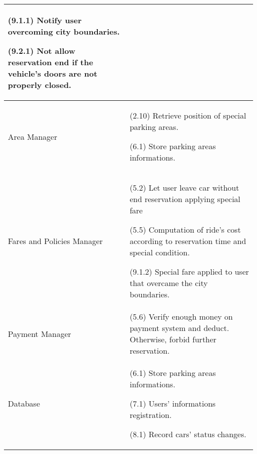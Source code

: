 \begin{longtable}{ |l|p{10cm}| }
(9.1.1) Notify user overcoming city boundaries.

(9.2.1) Not allow reservation end if the vehicle's doors are not properly closed.
\\ \hline

	Area Manager & (2.10) Retrieve position of special parking areas.

(6.1) Store parking areas informations.
\\ \hline

	Fares and Policies Manager & (5.2) Let user leave car without end reservation applying special fare

(5.5) Computation of ride's cost according to reservation time and special condition.

(9.1.2) Special fare applied to user that overcame the city boundaries.
\\ \hline

	Payment Manager & (5.6) Verify enough money on payment system and deduct. Otherwise, forbid further reservation.
\\ \hline

	Database & (6.1) Store parking areas informations.

(7.1) Users' informations registration.

(8.1) Record cars' status changes.
\\ \hline
\end{longtable}
